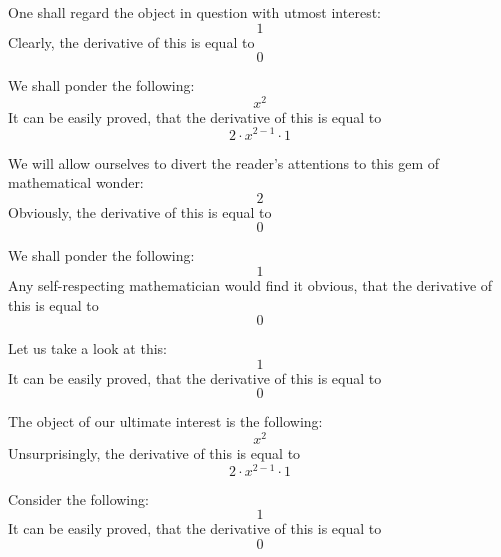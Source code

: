 \documentclass{article}
\begin{document}
One shall regard the object in question with utmost interest:
\begin{equation}
1 
\end{equation}
Clearly, the derivative of this is equal to
\begin{equation}
0 
\end{equation}

We shall ponder the following:
\begin{equation}
x ^{2 } 
\end{equation}
It can be easily proved, that the derivative of this is equal to
\begin{equation}
2 \cdot x ^{2 - 1 } \cdot 1 
\end{equation}

We will allow ourselves to divert the reader's attentions to this gem of mathematical wonder:
\begin{equation}
2 
\end{equation}
Obviously, the derivative of this is equal to
\begin{equation}
0 
\end{equation}

We shall ponder the following:
\begin{equation}
1 
\end{equation}
Any self-respecting mathematician would find it obvious, that the derivative of this is equal to
\begin{equation}
0 
\end{equation}

Let us take a look at this:
\begin{equation}
1 
\end{equation}
It can be easily proved, that the derivative of this is equal to
\begin{equation}
0 
\end{equation}

The object of our ultimate interest is the following:
\begin{equation}
x ^{2 } 
\end{equation}
Unsurprisingly, the derivative of this is equal to
\begin{equation}
2 \cdot x ^{2 - 1 } \cdot 1 
\end{equation}

Consider the following:
\begin{equation}
1 
\end{equation}
It can be easily proved, that the derivative of this is equal to
\begin{equation}
0 
\end{equation}
\end{document}
